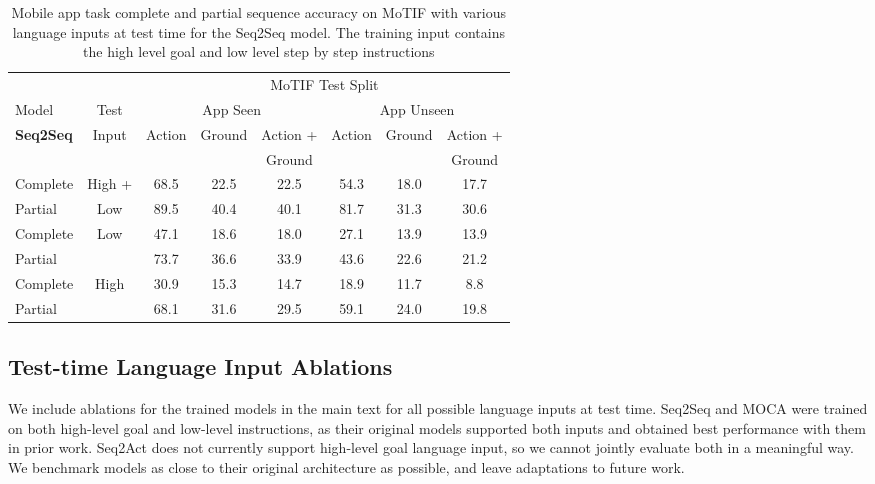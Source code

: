 \begin{table}[t]
    \centering
          \renewcommand\arraystretch{0.95}

        \caption{Mobile app task complete and partial sequence accuracy on MoTIF with various language inputs at test time for the Seq2Seq model. The training input contains the high level goal and low level step by step instructions }
    \begin{tabular}{|l|c|c|c|c|c|c|c|}
    \hline
    & & \multicolumn{6}{c|}{MoTIF Test Split}\\
    \cline{3-8}
      Model & Test & \multicolumn{3}{c|}{App Seen} & \multicolumn{3}{c|}{App Unseen}\\
    \cline{3-8}
  \textbf{Seq2Seq} & Input & \multirow{2}{*}{Action} & \multirow{2}{*}{Ground} & Action + &  \multirow{2}{*}{Action} & \multirow{2}{*}{Ground} & Action +\\
   & & & & Ground& & & Ground\\
    \hline
    Complete & High + & 68.5 & 22.5 & 22.5 & 54.3 & 18.0 & 17.7 \\
    Partial & Low & 89.5 & 40.4 & 40.1 & 81.7 & 31.3 & 30.6 \\
    \hline
    Complete &\multirow{2}{*}{Low} & 47.1 & 18.6 & 18.0 & 27.1 & 13.9 & 13.9 \\
    Partial & & 73.7 & 36.6 & 33.9 & 43.6 & 22.6 & 21.2 \\
    \hline
    Complete & \multirow{2}{*}{High} & 30.9 & 15.3 & 14.7 & 18.9 & 11.7 & 8.8 \\
    Partial & & 68.1 & 31.6 & 29.5 & 59.1 & 24.0 & 19.8 \\
    \hline
    \end{tabular}
    \label{tab:automate_eval1}
\end{table}
\subsection{Test-time Language Input Ablations}
\label{sec:auto_language}
We include ablations for the trained models in the main text for all possible language inputs at test time. Seq2Seq and MOCA were trained on both high-level goal and low-level instructions, as their original models supported both inputs and obtained best performance with them in prior work. Seq2Act does not currently support high-level goal language input, so we cannot jointly evaluate both in a meaningful way. We benchmark models as close to their original architecture as possible, and leave adaptations to future work.

